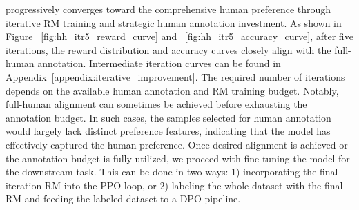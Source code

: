 \myname{} progressively converges toward the comprehensive human preference through iterative RM training and strategic human annotation investment. As shown in Figure ~\ref{fig:hh_itr5_reward_curve} and ~\ref{fig:hh_itr5_accuracy_curve}, after five iterations, the reward distribution and accuracy curves closely align with the full-human annotation. Intermediate iteration curves can be found in Appendix~\ref{appendix:iterative_improvement}. The required number of iterations depends on the available human annotation and RM training budget. Notably, full-human alignment can sometimes be achieved before exhausting the annotation budget. In such cases, the samples selected for human annotation would largely lack distinct preference features, indicating that the model has effectively captured the  human preference. Once desired alignment is achieved or the annotation budget is fully utilized, we proceed with fine-tuning the model for the downstream task. This can be done in two ways: 1) incorporating the final iteration RM into the PPO loop, or 2) labeling the whole dataset with the final RM and feeding the labeled dataset to a DPO pipeline.



